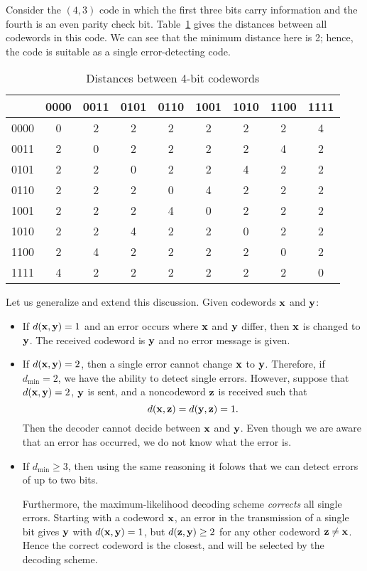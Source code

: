 \begin{example}{} Consider the $(4,3)$ code in which the first three bits carry
information and the fourth is an even parity check bit.
Table~\ref{algcodes:table1} gives the distances
between all codewords in this code.  We can see
that the minimum distance here is 2; hence, the code is suitable as
a single error-detecting code. 
  
\begin{table}[hbt]
\caption{Distances between 4-bit codewords\label{algcodes:table1}}{\small
\begin{center}
\begin{tabular}{|c|cccccccc|}
\hline
    & 0000 & 0011 & 0101 & 0110 & 1001 & 1010 & 1100 & 1111
\\ \hline
0000 & 0 & 2 & 2 & 2 & 2 & 2 & 2 & 4 \\
0011 & 2 & 0 & 2 & 2 & 2 & 2 & 4 & 2 \\
0101 & 2 & 2 & 0 & 2 & 2 & 4 & 2 & 2 \\
0110 & 2 & 2 & 2 & 0 & 4 & 2 & 2 & 2 \\
1001 & 2 & 2 & 2 & 4 & 0 & 2 & 2 & 2 \\
1010 & 2 & 2 & 4 & 2 & 2 & 0 & 2 & 2 \\
1100 & 2 & 4 & 2 & 2 & 2 & 2 & 0 & 2 \\
1111 & 4 & 2 & 2 & 2 & 2 & 2 & 2 & 0 \\
\hline
\end{tabular}
\end{center}
}
\end{table}
\end{example}
 
Let us generalize and extend this discussion. Given codewords ${\bold x}$ and ${\bold y}$:
\begin{itemize}
\item
 If
$d({\bold x}, {\bold y}) = 1$ and an error occurs where ${\bold x}$
and ${\bold y}$ differ, then ${\bold x}$ is changed to ${\bold y}$.
The received codeword is ${\bold y}$ and no error message is given.
\item
If $d({\bold x}, {\bold y}) = 2$, then a single error cannot
change ${\bold x}$ to ${\bold y}$. Therefore, if $d_{\min} = 2$, we
have the ability to detect single errors. However, suppose that
$d({\bold x}, {\bold y}) = 2$, ${\bold y}$ is sent, and a noncodeword
${\bold z}$ is received such that
\[
d({\bold x}, {\bold z}) = d({\bold y}, {\bold z}) = 1.
\]
Then the decoder cannot decide between ${\bold x}$ and ${\bold y}$. Even
though we are aware that an error has occurred, we do not know what
the error is.
\item 
If $d_{\min} \geq 3$, then using the same reasoning it folows that we can detect errors of up to two bits. 

Furthermore, the maximum-likelihood decoding scheme 
\emph{corrects} all single errors. Starting with a codeword ${\bold x}$, an
error in the transmission of a single bit gives ${\bold y}$ with
$d({\bold x}, {\bold y}) = 1$, but $d({\bold z}, {\bold y}) \geq 2$
for any other codeword ${\bold z} \neq {\bold x}$. Hence the correct codeword is the closest, and will be selected by the decoding scheme.
 \end{itemize}
 
